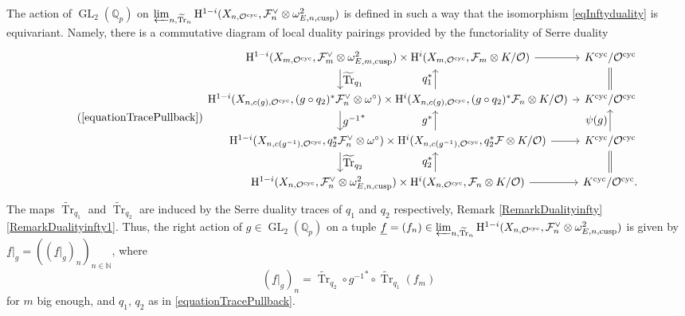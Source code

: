 \documentclass[JEP,XML,SOM,Unicode,published]{cedram}
\let\ts\textstyle
\newcommand{\cusp}{\mathrm{cusp}}
\newcommand{\cyc}{\mathrm{cyc}}
\numberwithin{equation}{section}
\theoremstyle{definition}
\newcommand{\bb}[1]{\mathbb{#1}}
\newcommand{\n}[1]{\mathcal{#1}}
\DeclareMathOperator{\GL}{GL}
\DeclareMathOperator{\Tr}{Tr}
\begin{document}
The action of $\GL_2(\bb{Q}_p)$ on $ \varprojlim_{n, \widetilde{\Tr}_n} \mathrm{H}^{1-i}(X_{n,\n{O}^{\cyc}}, \n{F}_n^{\vee} \otimes \omega^2_{E,n,\cusp})$ is defined in such a way that the isomorphism \eqref{eqInftyduality} is equivariant. Namely, there is a commutative diagram of local duality pairings provided by the functoriality of Serre duality
\bgroup
\smaller
{}\label{equationTracePullback}
\begin{equation*}
\tag*{{\normalsize(\ref{equationTracePullback})}}
\begin{tikzcd}[column sep=5pt]
\mathrm{H}^{1-i}(X_{m, \n{O}^{\cyc}}, \n{F}_m^\vee\otimes \omega^2_{E,m,\cusp})\times \mathrm{H}^i(X_{m,\n{O}^{\cyc}}, \n{F}_m \otimes K/ \n{O}) \ar[r] \ar[d, shift right=1.5cm, "\ts \widetilde{\Tr}_{q_1}"]& K^{\cyc}/\n{O}^{\cyc} \ar[d, equal]\\
\mathrm{H}^{1-i}(X_{n,c(g), \n{O}^{\cyc}}, (g\circ q_2)^* \n{F}_n^\vee \otimes \omega^\circ)\times \mathrm{H}^i(X_{n,c(g), \n{O}^{\cyc}}, (g\circ q_2)^*\n{F}_n \otimes K/ \n{O})\ar[r] \ar[d, shift right=1.5cm, "\ts {g^{-1}}^*"] \ar[u, shift right =1.5cm, "\ts q_1^*"]& K^{\cyc}/ \n{O}^{\cyc} \\
\mathrm{H}^{1-i}(X_{n,c(g^{-1}), \n{O}^{\cyc}}, q_2^*\n{F}_n^\vee \otimes \omega^\circ)\times \mathrm{H}^i(X_{n,c(g^{-1}), \n{O}^{\cyc}}, q_2^* \n{F} \otimes K/ \n{O}) \ar[r] \ar[d, shift right=1.5cm, "\ts \widetilde{\Tr}_{q_2}"] \ar[u, shift right =1.5cm, "\ts g^*"] & K^{\cyc}/ \n{O}^{\cyc} \ar[d, equal] \ar[u, "\ts \psi(g)"] \\
\mathrm{H}^{1-i}(X_{n,\n{O}^{\cyc}}, \n{F}_n^\vee \otimes \omega^2_{E,n,\cusp})\times \mathrm{H}^i(X_{n, \n{O}^{\cyc}}, \n{F}_n\otimes K/ \n{O}) \ar[r] \ar[u, shift right =1.5cm, "\ts q_2^*"]& K^{\cyc}/\n{O}^{\cyc}.
\end{tikzcd}
\end{equation*}
\egroup
The maps $\widetilde{\Tr}_{q_1}$ and $\widetilde{\Tr}_{q_2}$ are induced by the Serre duality traces of $q_1$ and $q_2$ respec\-ti\-vely, \cf Remark \ref{RemarkDualityinfty}\eqref{RemarkDualityinfty1}. Thus, the right action of $g\in \GL_2(\bb{Q}_p)$ on a tuple $\underline{f}=(f_n)\in \varprojlim_{n, \widetilde{\Tr}_n} \mathrm{H}^{1-i}(X_{n,\n{O}^{\cyc}}, \n{F}_n^\vee \otimes \omega^2_{E,n,\cusp})$ is given by $\underline{f}|_{g}= ((\underline{f}|_g)_n)_{n\in \bb{N}}$, where
\[
(\underline{f}|_g)_n = \widetilde{\Tr}_{q_2}\circ {g^{-1}}^*\circ \widetilde{\Tr}_{q_1}(f_m)
\]
for $m$ big enough, and $q_1$, $q_2$ as in \eqref{equationTracePullback}.
\end{document}
